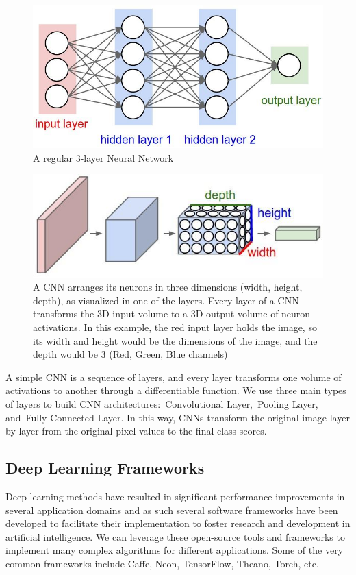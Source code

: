 \begin{figure}[h]
	\includegraphics[width=1\linewidth]{extra-12}
	\centering
	\caption{\label{fig: extra-12}A regular 3-layer Neural Network~\cite{CS231nCo51:online}}
\end{figure}
\begin{figure}[h]
	\includegraphics[width=1\linewidth]{extra-13}
	\centering
	\caption{\label{fig: extra-13}A CNN arranges its neurons in three dimensions (width, height, depth), as visualized in one of the layers. Every layer of a CNN transforms the 3D input volume to a 3D output volume of neuron activations. In this example, the red input layer holds the image, so its width and height would be the dimensions of the  image, and the depth would be 3 (Red, Green, Blue channels)~\cite{CS231nCo51:online}}
\end{figure}


A simple CNN is a sequence of layers, and every layer transforms one volume of activations to another through a differentiable function. We use three main types of layers to build CNN architectures: Convolutional Layer, Pooling Layer, and Fully-Connected Layer. In this way, CNNs transform the original image layer by layer from the original pixel values to the final class scores. 


\subsection{Deep Learning Frameworks}
Deep learning methods have resulted in significant performance improvements in several application domains and as such several software frameworks have been developed to facilitate their implementation to foster research and development in artificial intelligence. We can leverage these open-source tools and frameworks to implement many complex algorithms for different applications. Some of the very common frameworks include Caffe, Neon, TensorFlow, Theano, Torch, etc. 

